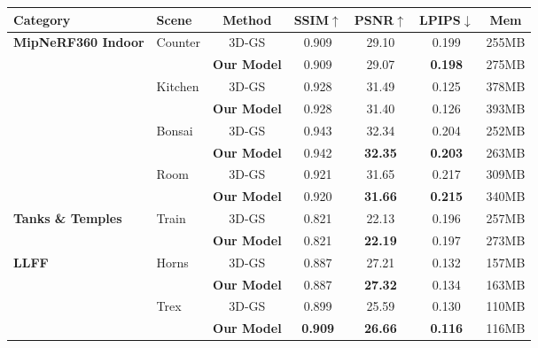 
    \begin{tabular}{llccccc}
    \toprule
    \textbf{Category} & \textbf{Scene} & \textbf{Method} & \textbf{SSIM$\uparrow$} & \textbf{PSNR$\uparrow$} & \textbf{LPIPS$\downarrow$} & \textbf{Mem} \\
    \midrule
    \multirow{8}{*}{\textbf{MipNeRF360 Indoor}} & 
        \multirow{2}{*}{Counter} 
        & 3D-GS & 0.909 & 29.10 & 0.199 & 255MB \\
            & & \textbf{Our Model} & 0.909 & 29.07 & \textbf{0.198} & 275MB \\
            \cmidrule{2-7} &
        \multirow{2}{*}{Kitchen} 
        & 3D-GS & 0.928 & 31.49 & 0.125 & 378MB \\
            & & \textbf{Our Model} & 0.928 & 31.40 & 0.126 & 393MB \\
            \cmidrule{2-7} &
        \multirow{2}{*}{Bonsai} 
        & 3D-GS & 0.943 & 32.34 & 0.204 & 252MB \\
            & & \textbf{Our Model} & 0.942 & \textbf{32.35} & \textbf{0.203} & 263MB \\
            \cmidrule{2-7} &
        \multirow{2}{*}{Room} 
        & 3D-GS & 0.921 & 31.65 & 0.217 & 309MB \\
            & & \textbf{Our Model} & 0.920 & \textbf{31.66} & \textbf{0.215} & 340MB \\
        \midrule
    \multirow{2}{*}{\textbf{Tanks \& Temples}} & 
        \multirow{2}{*}{Train} 
        & 3D-GS & 0.821 & 22.13 & 0.196 & 257MB \\
            & & \textbf{Our Model} & 0.821 & \textbf{22.19} & 0.197 & 273MB \\
        \midrule
    \multirow{4}{*}{\textbf{LLFF}} & 
        \multirow{2}{*}{Horns} 
        & 3D-GS & 0.887 & 27.21 & 0.132 & 157MB \\
            & & \textbf{Our Model} & 0.887 & \textbf{27.32} & 0.134 & 163MB \\
            \cmidrule{2-7} &
        \multirow{2}{*}{Trex} 
        & 3D-GS & 0.899 & 25.59 & 0.130 & 110MB \\
            & & \textbf{Our Model} & \textbf{0.909} & \textbf{26.66} & \textbf{0.116} & 116MB \\
    \bottomrule
    \end{tabular}